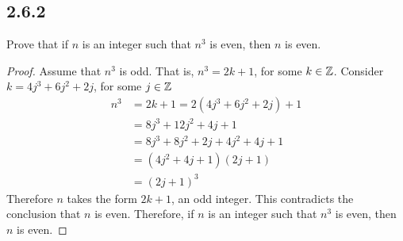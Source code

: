 \subsection*{2.6.2}
\begin{enumerate}
   Prove that if $n$ is an integer such that $n^3$ is even, then $n$ is even.
  \begin{proof}
    Assume that $n^3$ is odd. That is, $n^3 = 2k+1$, for some $k \in \mathbb{Z}$. Consider $k = 4j^3+6j^2+2j$, for some $j \in \mathbb{Z}$
    \begin{align*}
      n^3 & = 2k+1 = 2(4j^3+6j^2+2j) + 1       \\
          & = 8j^3 + 12j^2 + 4j + 1            \\
          & = 8j^3 + 8j^2 + 2j + 4j^2 + 4j + 1 \\
          & = (4j^2+4j+1)(2j+1)                \\
          & = (2j+1)^3
    \end{align*}
    Therefore $n$ takes the form $2k+1$, an odd integer. This contradicts the conclusion that $n$ is even. Therefore, if $n$ is an integer such that $n^3$ is even, then $n$ is even.
  \end{proof}
\end{enumerate}

